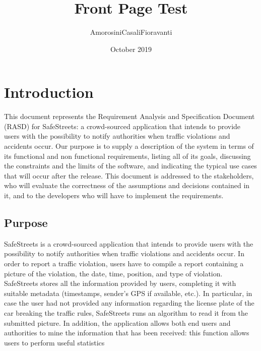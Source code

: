 \documentclass{report}
\title{Front Page Test}
\author{AmorosiniCasaliFioravanti}
\date{October 2019}
\begin{document}
\maketitle 
\tableofcontents
\chapter{Introduction}
This document represents the Requirement Analysis and Specification Document (RASD) for SafeStreets: a crowd-sourced application that intends to provide users with the possibility to notify authorities when traffic violations and accidents occur. Our purpose is to supply a description of the system in terms of its functional and non functional requirements, listing all of its goals, discussing the constraints and the limits of the software, and indicating the typical use cases that will occur after the release. This document is addressed to the stakeholders, who will evaluate the correctness of the assumptions and decisions contained in it, and to the developers who will have to implement the requirements.
\section{Purpose}
SafeStreets is a crowd-sourced application that intends to provide users with the possibility to notify authorities when traffic violations and accidents occur. In order to report a traffic violation, users have to compile a report containing a picture of the violation, the date, time, position, and type of violation. SafeStreets stores all the information provided by users, completing it with suitable metadata (timestamps, sender's GPS if available, etc.). In particular, in case the user had not provided any information regarding the license plate of the car breaking the traffic rules, SafeStreets runs an algorithm to read it from the submitted picture. In addition, the application allows both end users and authorities to mine the information that has been received: this function allows users to perform useful statistics
\end{document}
